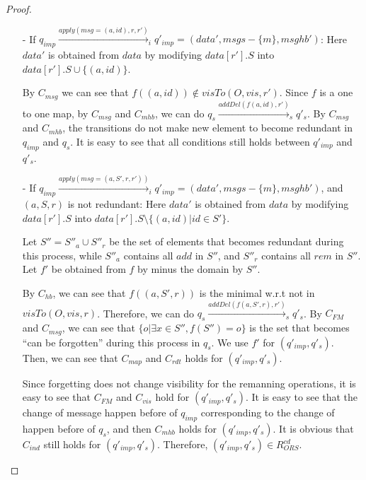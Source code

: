 \begin {proof}
\begin{itemize}
\item[-] If $q_{\mathit{imp}} \xrightarrow{\mathit{apply}( \mathit{msg}=(a,\mathit{id}),r,r' )}_i q'_{\mathit{imp}} = (\mathit{data}',\mathit{msgs} - \{ m \},\mathit{msghb}')$: Here $\mathit{data}'$ is obtained from $\mathit{data}$ by modifying $\mathit{data}[r'].S$ into $\mathit{data}[r'].S \cup \{ (a,\mathit{id}) \}$.

    By $C_{\mathit{msg}}$ we can see that $f((a,\mathit{id})) \notin \mathit{visTo}(O,\mathit{vis},r')$. Since $f$ is a one to one map, by $C_{\mathit{msg}}$ and $C_{\mathit{mhb}}$, we can do $q_s \xrightarrow{\mathit{addDel}( f(a,\mathit{id}),r' )}_s q'_s$. By $C_{\mathit{msg}}$ and $C_{\mathit{mhb}}$, the transitions do not make new element to become redundant in $q_{\mathit{imp}}$ and $q_s$. It is easy to see that all conditions still holds between $q'_{\mathit{imp}}$ and $q'_s$.

\item[-] If $q_{\mathit{imp}} \xrightarrow{\mathit{apply}( \mathit{msg}=(a,S',r,r' ))}_i q'_{\mathit{imp}} = (\mathit{data}',\mathit{msgs} - \{ m \},\mathit{msghb}')$, and $(a,S,r)$ is not redundant: Here $\mathit{data}'$ is obtained from $\mathit{data}$ by modifying $\mathit{data}[r'].S$ into $\mathit{data}[r'].S \setminus \{ (a,\mathit{id}) \vert \mathit{id} \in S'\}$.

    Let $S'' = S''_a \cup S''_r$ be the set of elements that becomes redundant during this process, while $S''_a$ contains all $\mathit{add}$ in $S''$, and $S''_r$ contains all $\mathit{rem}$ in $S''$. Let $f'$ be obtained from $f$ by minus the domain by $S''$.

    By $C_{\mathit{hb}}$, we can see that $f((a,S',r))$ is the minimal w.r.t not in $\mathit{visTo}(O,\mathit{vis},r)$. Therefore, we can do $q_s \xrightarrow{\mathit{addDel}( f(a,S',r),r' )}_s q'_s$. By $C_{\mathit{FM}}$ and $C_{\mathit{msg}}$, we can see that $\{ o \vert \exists x \in S'', f(S'') = o \}$ is the set that becomes ``can be forgotten'' during this process in $q_s$. We use $f'$ for $(q'_{\mathit{imp}},q'_s)$. Then, we can see that $C_{\mathit{map}}$ and $C_{\mathit{rdt}}$ holds for $(q'_{\mathit{imp}},q'_s)$.

    Since forgetting does not change visibility for the remanning operations, it is easy to see that $C_{\mathit{FM}}$ and $C_{\mathit{vis}}$ hold for $(q'_{\mathit{imp}},q'_s)$. It is easy to see that the change of message happen before of $q_{\mathit{imp}}$ corresponding to the change of happen before of $q_s$, and then $C_{\mathit{mhb}}$ holds for $(q'_{\mathit{imp}},q'_s)$. It is obvious that $C_{\mathit{ind}}$ still holds for $(q'_{\mathit{imp}},q'_s)$. Therefore, $(q'_{\mathit{imp}},q'_s) \in R_{\mathit{ORS}}^{\mathit{cd}}$.


\end{itemize}
\end{proof}
